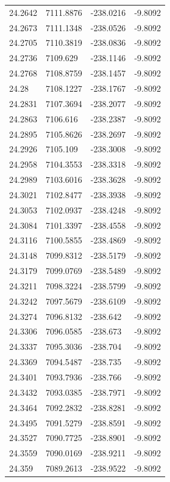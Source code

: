 \begin{table}[H]
\begin{tabular}{llll}
24.2642 & 7111.8876 & -238.0216 & -9.8092 \\
24.2673 & 7111.1348 & -238.0526 & -9.8092 \\
24.2705 & 7110.3819 & -238.0836 & -9.8092 \\
24.2736 & 7109.629 & -238.1146 & -9.8092 \\
24.2768 & 7108.8759 & -238.1457 & -9.8092 \\
24.28 & 7108.1227 & -238.1767 & -9.8092 \\
24.2831 & 7107.3694 & -238.2077 & -9.8092 \\
24.2863 & 7106.616 & -238.2387 & -9.8092 \\
24.2895 & 7105.8626 & -238.2697 & -9.8092 \\
24.2926 & 7105.109 & -238.3008 & -9.8092 \\
24.2958 & 7104.3553 & -238.3318 & -9.8092 \\
24.2989 & 7103.6016 & -238.3628 & -9.8092 \\
24.3021 & 7102.8477 & -238.3938 & -9.8092 \\
24.3053 & 7102.0937 & -238.4248 & -9.8092 \\
24.3084 & 7101.3397 & -238.4558 & -9.8092 \\
24.3116 & 7100.5855 & -238.4869 & -9.8092 \\
24.3148 & 7099.8312 & -238.5179 & -9.8092 \\
24.3179 & 7099.0769 & -238.5489 & -9.8092 \\
24.3211 & 7098.3224 & -238.5799 & -9.8092 \\
24.3242 & 7097.5679 & -238.6109 & -9.8092 \\
24.3274 & 7096.8132 & -238.642 & -9.8092 \\
24.3306 & 7096.0585 & -238.673 & -9.8092 \\
24.3337 & 7095.3036 & -238.704 & -9.8092 \\
24.3369 & 7094.5487 & -238.735 & -9.8092 \\
24.3401 & 7093.7936 & -238.766 & -9.8092 \\
24.3432 & 7093.0385 & -238.7971 & -9.8092 \\
24.3464 & 7092.2832 & -238.8281 & -9.8092 \\
24.3495 & 7091.5279 & -238.8591 & -9.8092 \\
24.3527 & 7090.7725 & -238.8901 & -9.8092 \\
24.3559 & 7090.0169 & -238.9211 & -9.8092 \\
24.359 & 7089.2613 & -238.9522 & -9.8092 \\

\end{tabular}
\end{table}
